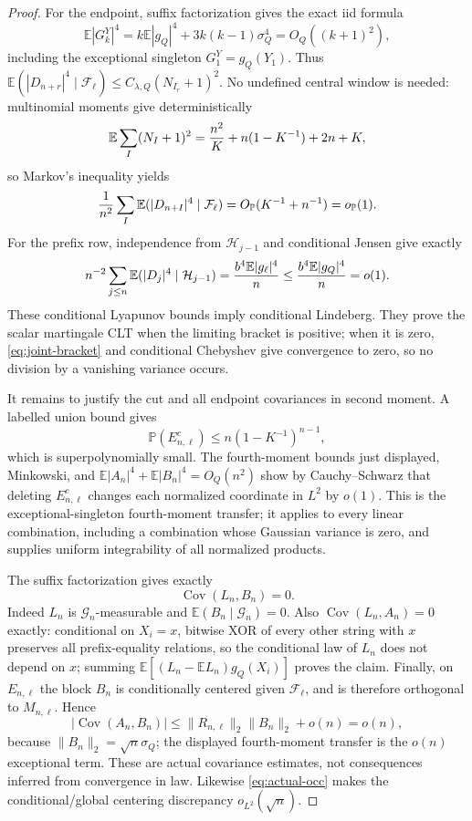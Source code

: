 \documentclass[11pt]{article}
\numberwithin{equation}{section}
\newcommand{\1}{\mathbf 1}\newcommand{\F}{\mathcal F}\newcommand{\D}{\mathcal D}
\begin{document}
\begin{proof}
For the endpoint, suffix factorization gives the exact iid formula
\[
 \mathbb E|G_k^Y|^4
 =k\mathbb E|g_Q|^4+3k(k-1)\sigma_Q^4=O_Q((k+1)^2),
\]
including the exceptional singleton $G_1^Y=g_Q(Y_1)$.  Thus
$\mathbb E(|D_{n+r}|^4\mid\mathcal F_\ell)\le C_{\lambda,Q}(N_{I_r}+1)^2$.  No undefined
central window is needed: multinomial moments give deterministically
\[
 \mathbb E\sum_I(N_I+1)^2
 ={n^2\over K}+n(1-K^{-1})+2n+K,
\]
so Markov's inequality yields
\[
 {1\over n^2}\sum_I
 \mathbb E(|D_{n+I}|^4\mid\mathcal F_\ell)
 =O_{\mathbb P}(K^{-1}+n^{-1})=o_{\mathbb P}(1).
\]
For the prefix row, independence from $\mathcal H_{j-1}$ and conditional
Jensen give exactly
\[
 n^{-2}\sum_{j\le n}\mathbb E(|D_j|^4\mid\mathcal H_{j-1})
 ={b^4\mathbb E|g_\ell|^4\over n}
 \le {b^4\mathbb E|g_Q|^4\over n}=o(1).
\]
These conditional Lyapunov bounds imply conditional Lindeberg.  They prove
the scalar martingale CLT when the limiting bracket is positive; when it is
zero, \eqref{eq:joint-bracket} and conditional Chebyshev give convergence
to zero, so no division by a vanishing variance occurs.

It remains to justify the cut and all endpoint covariances in second
moment.  A labelled union bound gives
\[
 \mathbb P(E_{n,\ell}^c)\le n(1-K^{-1})^{n-1},
\]
which is superpolynomially small.  The fourth-moment bounds just displayed,
Minkowski, and $\mathbb E|A_n|^4+\mathbb E|B_n|^4=O_Q(n^2)$ show by
Cauchy--Schwarz that deleting $E_{n,\ell}^c$ changes each normalized
coordinate in $L^2$ by $o(1)$.  This is the exceptional-singleton
fourth-moment transfer; it applies to every linear combination, including a
combination whose Gaussian variance is zero, and supplies uniform
integrability of all normalized products.

The suffix factorization gives exactly
\begin{equation}\operatorname {Cov}(L_n,B_n)=0.        \label{eq:LBexact}\end{equation}
Indeed $L_n$ is $\mathcal G_n$-measurable and
$\mathbb E(B_n\mid\mathcal G_n)=0$.  Also
$\operatorname {Cov}(L_n,A_n)=0$ exactly: conditional on $X_i=x$, bitwise
XOR of every other string with $x$ preserves all prefix-equality relations,
so the conditional law of $L_n$ does not depend on $x$; summing
$\mathbb E[(L_n-\mathbb EL_n)g_Q(X_i)]$ proves the claim.  Finally, on
$E_{n,\ell}$ the block $B_n$ is conditionally centered given
$\mathcal F_\ell$, and is therefore orthogonal to $M_{n,\ell}$.  Hence
\[
 |\operatorname {Cov}(A_n,B_n)|
 \le\|R_{n,\ell}\|_2\|B_n\|_2+o(n)=o(n),
\]
because $\|B_n\|_2=\sqrt n\sigma_Q$; the displayed fourth-moment transfer
is the $o(n)$ exceptional term.  These are actual covariance estimates,
not consequences inferred from convergence in law.  Likewise
\eqref{eq:actual-occ} makes the conditional/global centering discrepancy
$o_{L^2}(\sqrt n)$.


\end{proof}
\end{document}
